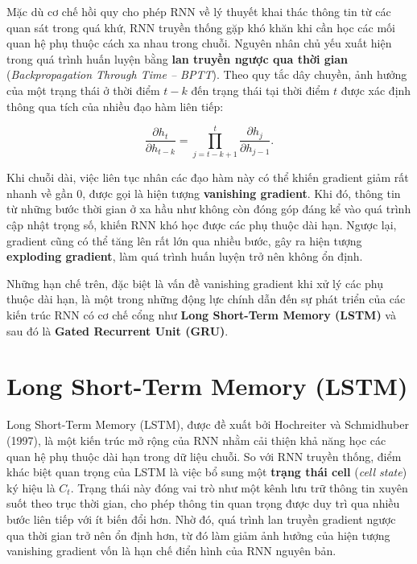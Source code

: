 \documentclass[12pt,oneside]{report}
\begin{document}
Mặc dù cơ chế hồi quy cho phép RNN về lý thuyết khai thác thông tin từ các quan sát trong quá khứ, RNN truyền thống gặp khó khăn khi cần học các mối quan hệ phụ thuộc cách xa nhau trong chuỗi. Nguyên nhân chủ yếu xuất hiện trong quá trình huấn luyện bằng \textbf{lan truyền ngược qua thời gian} (\textit{Backpropagation Through Time -- BPTT}). Theo quy tắc dây chuyền, ảnh hưởng của một trạng thái ở thời điểm $t-k$ đến trạng thái tại thời điểm $t$ được xác định thông qua tích của nhiều đạo hàm liên tiếp:

\begin{equation}
\frac{\partial h_t}{\partial h_{t-k}} = \prod_{j=t-k+1}^{t} \frac{\partial h_j}{\partial h_{j-1}}.
\end{equation}

Khi chuỗi dài, việc liên tục nhân các đạo hàm này có thể khiến gradient giảm rất nhanh về gần $0$, được gọi là hiện tượng \textbf{vanishing gradient}. Khi đó, thông tin từ những bước thời gian ở xa hầu như không còn đóng góp đáng kể vào quá trình cập nhật trọng số, khiến RNN khó học được các phụ thuộc dài hạn. Ngược lại, gradient cũng có thể tăng lên rất lớn qua nhiều bước, gây ra hiện tượng \textbf{exploding gradient}, làm quá trình huấn luyện trở nên không ổn định.

Những hạn chế trên, đặc biệt là vấn đề vanishing gradient khi xử lý các phụ thuộc dài hạn, là một trong những động lực chính dẫn đến sự phát triển của các kiến trúc RNN có cơ chế cổng như \textbf{Long Short-Term Memory (LSTM)} và sau đó là \textbf{Gated Recurrent Unit (GRU)}.

\section{Long Short-Term Memory (LSTM)}

Long Short-Term Memory (LSTM), được đề xuất bởi Hochreiter và Schmidhuber (1997), là một kiến trúc mở rộng của RNN nhằm cải thiện khả năng học các quan hệ phụ thuộc dài hạn trong dữ liệu chuỗi. So với RNN truyền thống, điểm khác biệt quan trọng của LSTM là việc bổ sung một \textbf{trạng thái cell} (\textit{cell state}) ký hiệu là $C_t$. Trạng thái này đóng vai trò như một kênh lưu trữ thông tin xuyên suốt theo trục thời gian, cho phép thông tin quan trọng được duy trì qua nhiều bước liên tiếp với ít biến đổi hơn. Nhờ đó, quá trình lan truyền gradient ngược qua thời gian trở nên ổn định hơn, từ đó làm giảm ảnh hưởng của hiện tượng vanishing gradient vốn là hạn chế điển hình của RNN nguyên bản.
\end{document}
